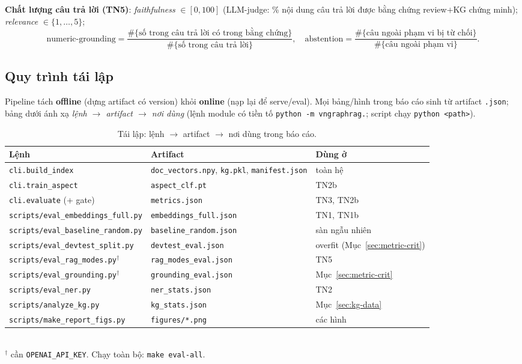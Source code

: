 \documentclass[12pt,a4paper]{article}
\begin{document}
\noindent\textbf{Chất lượng câu trả lời (TN5)}: \textit{faithfulness} $\in[0,100]$ (LLM-judge: \% nội dung câu trả lời được bằng chứng review$+$KG chứng minh); \textit{relevance} $\in\{1,\dots,5\}$;
\[
  \text{numeric-grounding}=\frac{\#\{\text{số trong câu trả lời có trong bằng chứng}\}}{\#\{\text{số trong câu trả lời}\}},
  \quad
  \text{abstention}=\frac{\#\{\text{câu ngoài phạm vi bị từ chối}\}}{\#\{\text{câu ngoài phạm vi}\}}.
\]

\subsection{Quy trình tái lập}
\label{sec:repro}

Pipeline tách \textbf{offline} (dựng artifact có version) khỏi \textbf{online} (nạp lại để serve/eval). Mọi bảng/hình trong báo cáo sinh từ artifact \texttt{.json}; bảng dưới ánh xạ \textit{lệnh $\to$ artifact $\to$ nơi dùng} (lệnh module có tiền tố \texttt{python -m vngraphrag.}; script chạy \texttt{python <path>}).

\begin{table}[H]
\centering\footnotesize
\caption{Tái lập: lệnh $\to$ artifact $\to$ nơi dùng trong báo cáo.}
\renewcommand{\arraystretch}{1.2}
\begin{tabular}{p{4.9cm}p{3.6cm}p{3.2cm}}
\toprule
\textbf{Lệnh} & \textbf{Artifact} & \textbf{Dùng ở} \\
\midrule
\texttt{cli.build\_index} & \texttt{doc\_vectors.npy}, \texttt{kg.pkl}, \texttt{manifest.json} & toàn hệ \\
\texttt{cli.train\_aspect} & \texttt{aspect\_clf.pt} & TN2b \\
\texttt{cli.evaluate} (+ gate) & \texttt{metrics.json} & TN3, TN2b \\
\texttt{scripts/eval\_embeddings\_full.py} & \texttt{embeddings\_full.json} & TN1, TN1b \\
\texttt{scripts/eval\_baseline\_random.py} & \texttt{baseline\_random.json} & sàn ngẫu nhiên \\
\texttt{scripts/eval\_devtest\_split.py} & \texttt{devtest\_eval.json} & overfit (Mục~\ref{sec:metric-crit}) \\
\texttt{scripts/eval\_rag\_modes.py}$^\dagger$ & \texttt{rag\_modes\_eval.json} & TN5 \\
\texttt{scripts/eval\_grounding.py}$^\dagger$ & \texttt{grounding\_eval.json} & Mục~\ref{sec:metric-crit} \\
\texttt{scripts/eval\_ner.py} & \texttt{ner\_stats.json} & TN2 \\
\texttt{scripts/analyze\_kg.py} & \texttt{kg\_stats.json} & Mục~\ref{sec:kg-data} \\
\texttt{scripts/make\_report\_figs.py} & \texttt{figures/*.png} & các hình \\
\bottomrule
\end{tabular}
\\[3pt]{\footnotesize $^\dagger$ cần \texttt{OPENAI\_API\_KEY}. Chạy toàn bộ: \texttt{make eval-all}.}
\end{table}
\end{document}
